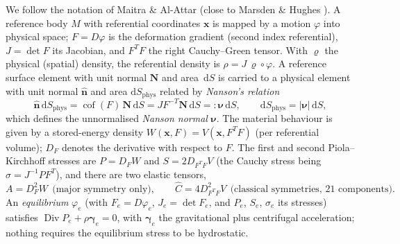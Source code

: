 \documentclass[11pt]{article}
\numberwithin{equation}{section}
\theoremstyle{remark}
\newcommand{\dS}{\,\mathrm{d}S}
\newcommand{\cof}{\operatorname{cof}}
\newcommand{\Div}{\operatorname{Div}}
\newcommand{\vn}{\hat{\mathbf{n}}}
\newcommand{\vN}{\mathbf{N}}
\newcommand{\vx}{\mathbf{x}}
\newcommand{\bnu}{\bm{\nu}}
\newcommand{\Ch}{\hat{C}}
\begin{document}
We follow the notation of Maitra \& Al-Attar \cite{MaitraAlAttar2021}
(close to Marsden \& Hughes \cite{MarsdenHughes}). A reference body $M$
with referential coordinates $\vx$ is mapped by a motion $\varphi$ into
physical space; $F = D\varphi$ is the deformation gradient (second index
referential), $J = \det F$ its Jacobian, and $F^TF$ the right
Cauchy--Green tensor. With $\varrho$ the physical (spatial) density, the
referential density is $\rho = J\,\varrho\circ\varphi$. A reference
surface element with unit normal $\vN$ and area $\dS$ is carried to a
physical element with unit normal $\vn$ and area $\mathrm{d}S_{\mathrm{phys}}$
related by \emph{Nanson's relation}
\begin{equation}
  \vn\,\mathrm{d}S_{\mathrm{phys}} = \cof(F)\,\vN\dS = J F^{-T}\vN\dS
  =: \bnu\dS, \qquad \mathrm{d}S_{\mathrm{phys}} = |\bnu|\dS,
  \label{eq:nanson0}
\end{equation}
which defines the unnormalised \emph{Nanson normal} $\bnu$. The material
behaviour is given by a stored-energy density $W(\vx,F) = V(\vx,F^TF)$
(per referential volume); $D_F$ denotes the derivative with respect to
$F$. The first and second Piola--Kirchhoff stresses are $P = D_F W$ and
$S = 2 D_{F^TF} V$ (the Cauchy stress being $\sigma = J^{-1}PF^T$), and
there are two elastic tensors,
\begin{equation}
  A = D_F^2 W \ \ \text{(major symmetry only)}, \qquad
  \Ch = 4 D_{F^TF}^2 V \ \ \text{(classical symmetries, 21 components)} .
\end{equation}
An \emph{equilibrium} $\varphi_e$ (with $F_e = D\varphi_e$,
$J_e = \det F_e$, and $P_e$, $S_e$, $\sigma_e$ its stresses) satisfies
$\Div P_e + \rho\bm{\gamma}_e = 0$, with $\bm{\gamma}_e$ the gravitational
plus centrifugal acceleration; nothing requires the equilibrium stress to
be hydrostatic.
\end{document}
